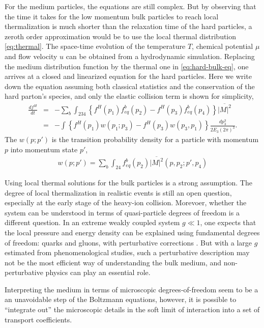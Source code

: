 For the medium particles, the equations are still complex.
But by observing that the time it takes for the low momentum bulk particles to reach local thermalization is much shorter than the relaxation time of the hard particles, a zeroth order approximation would be to use the local thermal distribution \ref{eq:thermal}.
The space-time evolution of the temperature $T$, chemical potential $\mu$ and flow velocity $u$ can be obtained from a hydrodynamic simulation.
Replacing the medium distribution function by the thermal one in \ref{eq:hard-bulk-eq}, one arrives at a closed and linearized equation for the hard particles.
Here we write down the equation assuming both classical statistics and the conservation of the hard parton's species, and only the elastic collision term is shown for simplicity,
\begin{eqnarray}
\frac{df^H}{dt} &=& -\sum_{b} \int_{234} \left\{
f^H(p_1)f^b_{eq}(p_2) - f^H(p_3)f^b_{eq}(p_4)\right\}
\overline{|M|^2} \\
&=& - \int \left\{
f^H(p_1) w(p_1; p_3) - f^H(p_3) w(p_3, p_1)\right\}\frac{dp_3^3}{2E_3 (2\pi)^3}.
\end{eqnarray}
The $w(p; p')$ is the transition probability density for a particle with momentum $p$ into momentum state $p'$,
\begin{eqnarray}
w(p; p') = \sum_b\int_{24} f_{eq}^b(p_2) \overline{|M|^2}(p, p_2; p', p_4)
\end{eqnarray}

Using local thermal solutions for the bulk particles is a strong assumption. 
The degree of local thermalization in realistic events is still an open question, especially at the early stage of the heavy-ion collision. 
Morevoer, whether the system can be understood in terms of quasi-particle degrees of freedom is a different question.
In an extreme weakly coupled system $g\ll 1$, one expects that the local pressure and energy density can be explained using fundamental degrees of freedom: quarks and gluons, with perturbative corrections \cite{Blaizot:2000fc,Strickland:2010tm,Su:2015esa}.
But with a large $g$ estimated from phenomenological studies, such a perturbative description may not be the most efficient way of understanding the bulk medium, and non-perturbative physics can play an essential role. 

Interpreting the medium in terms of microscopic degrees-of-freedom seem to be a an unavoidable step of the Boltzmann equations, however, it is possible to ``integrate out'' the microscopic details in the soft limit of interaction into a set of transport coefficients.

